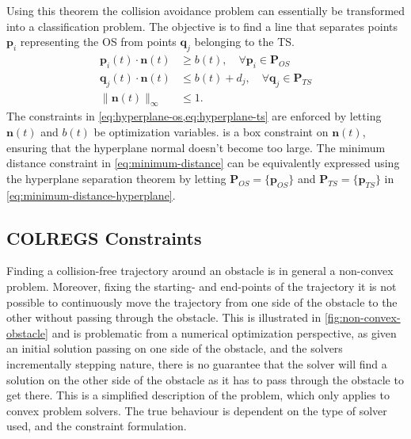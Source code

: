 Using this theorem the collision avoidance problem can essentially be transformed into a classification problem. The objective is to find a line that separates points $\mathbf p_i$ representing the OS from points $\mathbf q_j$ belonging to the TS.
\begin{subequations}\label{eq:minimum-distance-hyperplane}
    \begin{align}
        \mathbf p_{i}(t) \cdot{\mathbf n}(t) &\ge b(t), \quad\forall \mathbf p_i\in\mathbf P_{OS}
        \label{eq:hyperplane-os} \\
        \mathbf q_{j}(t) \cdot{\mathbf n}(t) &\le b(t) + d_{j}, \quad\forall \mathbf q_j\in\mathbf P_{TS}
        \label{eq:hyperplane-ts} \\
        \|{\mathbf n}(t)\|_\infty &\le 1.
        \label{eq:hyperplane-norm}
    \end{align}
\end{subequations}
The constraints in \cref{eq:hyperplane-os,eq:hyperplane-ts} are enforced by
letting $\mathbf n(t)$ and $b(t)$ be optimization variables.  is a box constraint on $\mathbf n(t)$, ensuring that the hyperplane normal doesn't become too large. The minimum distance constraint in \cref{eq:minimum-distance} can be equivalently expressed using the hyperplane separation theorem by letting $\mathbf P_{OS} = \{\mathbf p_{OS}\}$ and $\mathbf P_{TS} = \{\mathbf p_{TS}\}$ in \cref{eq:minimum-distance-hyperplane}.

\subsection{COLREGS Constraints}

Finding a collision-free trajectory around an obstacle is in general a non-convex problem. Moreover, fixing the starting- and end-points of the trajectory it is not possible to continuously move the trajectory from one side of the obstacle to the other without passing through the obstacle. This is illustrated in \cref{fig:non-convex-obstacle} and is problematic from a numerical optimization perspective, as given an initial solution passing on one side of the obstacle, and the solvers incrementally stepping nature, there is no guarantee that the solver will find a solution on the other side of the obstacle as it has to pass through the obstacle to get there. This is a simplified description of the problem, which only applies to convex problem solvers. The true behaviour is dependent on the type of solver used, and the constraint formulation.

